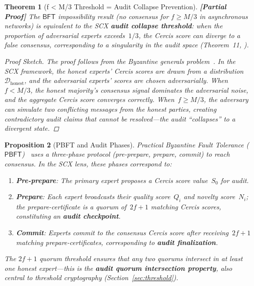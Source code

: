\documentclass[12pt,a4paper]{article}
\newtheorem{theorem}{Theorem}[section]
\newtheorem{proposition}[theorem]{Proposition}
\theoremstyle{remark}
\newcommand{\D}{\mathcal{D}}
\newcommand{\SCX}{\textsf{SCX}}
\newcommand{\Cercis}{\textsf{Cercis}}
\newcommand{\BFT}{\textsf{BFT}}
\newcommand{\PBFT}{\textsf{PBFT}}
\newcommand{\rigorPartial}{\textbf{[Partial Proof]}}
\begin{document}
\begin{theorem}[f < M/3 Threshold = Audit Collapse Prevention]
\label{thm:bft_threshold}
\rigorPartial
The $\BFT$ impossibility result (no consensus for $f \geq M/3$ in asynchronous networks) is equivalent to the \SCX{} \textbf{audit collapse threshold}: when the proportion of adversarial experts exceeds~$1/3$, the \Cercis{} score can diverge to a false consensus, corresponding to a singularity in the audit space (Theorem~11, \cite{scx_theory}).

\begin{proof}[Proof Sketch]
The proof follows from the Byzantine generals problem~\cite{lamport1982byzantine}. In the \SCX{} framework, the honest experts' \Cercis{} scores are drawn from a distribution~$\D_{\text{honest}}$, and the adversarial experts' scores are chosen adversarially. When~$f < M/3$, the honest majority's consensus signal dominates the adversarial noise, and the aggregate \Cercis{} score converges correctly. When~$f \geq M/3$, the adversary can simulate two conflicting messages from the honest parties, creating contradictory audit claims that cannot be resolved---the audit ``collapses'' to a divergent state.
\end{proof}
\end{theorem}

\begin{proposition}[PBFT and Audit Phases]
\label{prop:pbft_phases}
Practical Byzantine Fault Tolerance ($\PBFT$)~\cite{castro1999practical} uses a three-phase protocol (pre-prepare, prepare, commit) to reach consensus. In the \SCX{} lens, these phases correspond to:
\begin{enumerate}[leftmargin=*, label=(\arabic*)]
  \item \textbf{Pre-prepare}: The primary expert proposes a \Cercis{} score value~$S_0$ for audit.
  \item \textbf{Prepare}: Each expert broadcasts their quality score~$Q_i$ and novelty score~$N_i$; the prepare-certificate is a quorum of~$2f+1$ matching \Cercis{} scores, constituting an \textbf{audit checkpoint}.
  \item \textbf{Commit}: Experts commit to the consensus \Cercis{} score after receiving~$2f+1$ matching prepare-certificates, corresponding to \textbf{audit finalization}.
\end{enumerate}
The $2f+1$ quorum threshold ensures that any two quorums intersect in at least one honest expert---this is the \textbf{audit quorum intersection property}, also central to threshold cryptography (Section~\ref{sec:threshold}).
\end{proposition}
\end{document}
